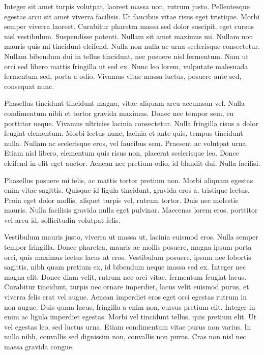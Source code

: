 \begin{btUnit}
Integer sit amet turpis volutpat, laoreet massa non, rutrum justo.
Pellentesque egestas arcu sit amet viverra facilisis. Ut faucibus
vitae risus eget tristique. Morbi semper viverra laoreet. Curabitur
pharetra massa sed dolor suscipit, eget cursus nisl vestibulum.
Suspendisse potenti. Nullam sit amet maximus mi. Nullam non mauris
quis mi tincidunt eleifend. Nulla non nulla ac urna scelerisque
consectetur. Nullam bibendum dui in tellus tincidunt, nec posuere nisl
fermentum. Nam ut orci sed libero mattis fringilla ut sed ex. Nunc leo
lorem, vulputate malesuada fermentum sed, porta a odio. Vivamus vitae
massa luctus, posuere ante sed, consequat nunc.

Phasellus tincidunt tincidunt magna, vitae aliquam arcu accumsan vel.
Nulla condimentum nibh et tortor gravida maximus. Donec nec tempor
sem, eu porttitor neque. Vivamus ultricies lacinia consectetur. Nulla
fringilla risus a dolor feugiat elementum. Morbi lectus nunc, lacinia
et ante quis, tempus tincidunt nulla. Nullam ac scelerisque eros, vel
faucibus sem. Praesent ac volutpat urna. Etiam nisl libero, elementum
quis risus non, placerat scelerisque leo. Donec eleifend in elit eget
auctor. Aenean nec pretium odio, id blandit dui. Nulla facilisi.

Phasellus posuere mi felis, ac mattis tortor pretium non. Morbi
aliquam egestas enim vitae sagittis. Quisque id ligula tincidunt,
gravida eros a, tristique lectus. Proin eget dolor mollis, aliquet
turpis vel, rutrum tortor. Duis nec molestie mauris. Nulla facilisis
gravida nulla eget pulvinar. Maecenas lorem eros, porttitor vel arcu
id, sollicitudin volutpat felis.

Vestibulum mauris justo, viverra ut massa ut, lacinia euismod eros.
Nulla semper tempor fringilla. Donec pharetra, mauris ac mollis
posuere, magna ipsum porta orci, quis maximus lectus lacus at eros.
Vestibulum posuere, ipsum nec lobortis sagittis, nibh quam pretium ex,
id bibendum neque massa sed ex. Integer nec magna elit. Donec diam
velit, rutrum nec orci vitae, fermentum feugiat lacus. Curabitur
tincidunt, turpis nec ornare imperdiet, lacus velit euismod purus, et
viverra felis erat vel augue. Aenean imperdiet eros eget orci egestas
rutrum in non augue. Duis quam lacus, fringilla a enim non, cursus
pretium elit. Integer in enim ac ligula imperdiet egestas. Morbi vel
tincidunt tellus, quis pretium elit. Ut vel egestas leo, sed luctus
urna. Etiam condimentum vitae purus non varius. In nulla nibh,
convallis sed dignissim non, convallis non purus. Cras non nisl nec
massa gravida congue.


\end{btUnit}
